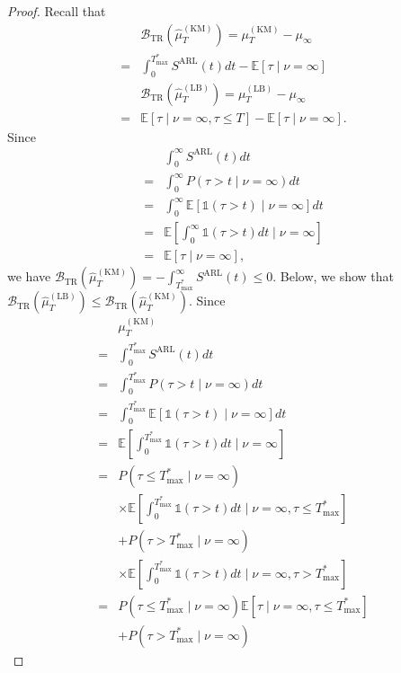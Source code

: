 \documentclass{article}
\theoremstyle{plain}
\theoremstyle{definition}
\theoremstyle{remark}
\def\nn{\nonumber \\ }
\def\mbe{\mathbb{E}}
\def\mbone{\mathds{1}}
\begin{document}
\begin{proof}
    Recall that 
    \begin{align}
        &\mathcal{B}_\mathrm{TR}(\hat{\mu}_T^\mathrm{(KM)}) =  \mu_T^{\mathrm{(KM)}} - \mu_\infty \nn
        =& \int_0^{T_\mathrm{max}^*} S^\mathrm{ARL}(t) dt
        - \mbe[\tau \mid \nu=\infty] \\
        &\mathcal{B}_\mathrm{TR}(\hat{\mu}_T^\mathrm{(LB)}) =  \mu_T^{\mathrm{(LB)}} - \mu_\infty \nn
        =& \mbe[\tau \mid \nu=\infty, \tau \leq T]
        - \mbe[\tau \mid \nu=\infty].
    \end{align}
    Since 
    \begin{align}
        &\int_0^\infty S^\mathrm{ARL}(t)  dt \\
        =& \int_0^\infty P(\tau > t \mid \nu = \infty) dt \\
        =& \int_0^\infty  \mbe[\mbone(\tau > t) \mid \nu = \infty] dt \\
        =& \mbe[\int_0^\infty \mbone(\tau > t) dt \mid \nu = \infty] \\
        =& \mbe[\tau \mid \nu=\infty]  ,
    \end{align}
    we have 
    $\mathcal{B}_\mathrm{TR}(\hat{\mu}_T^\mathrm{(KM)}) = - \int_{T_\mathrm{max}^*}^\infty S^\mathrm{ARL}(t) \leq 0$.    
    Below, we show that $\mathcal{B}_\mathrm{TR}(\hat{\mu}_T^\mathrm{(LB)}) \leq \mathcal{B}_\mathrm{TR}(\hat{\mu}_T^\mathrm{(KM)})$.
    Since
    \begin{align}
        &\mu_T^\mathrm{(KM)} \nn 
        =& \int_0^{T_\mathrm{max}^*} S^\mathrm{ARL}(t) dt \\
        =&  \int_0^{T_\mathrm{max}^*}  P(\tau > t \mid \nu=\infty) dt\\
        =&  \int_0^{T_\mathrm{max}^*} \mbe[\mbone(\tau > t) \mid \nu = \infty] dt\\
        =&  \mbe [\int_0^{T_\mathrm{max}^*} \mbone(\tau > t) dt \mid \nu = \infty]\\
        =&  P(\tau \leq T_\mathrm{max}^* \mid \nu=\infty) \nn 
            &\times \mbe[ \int_0^{T_\mathrm{max}^*} \mbone(\tau > t)  dt \mid \nu=\infty, \tau \leq T_\mathrm{max}^* ] \nn
            &+  P(\tau > T_\mathrm{max}^* \mid \nu=\infty) \nn 
            &\times \mbe[ \int_0^{T_\mathrm{max}^*} \mbone(\tau > t)  dt \mid \nu = \infty, \tau > T_\mathrm{max}^*]\\
        =&  P(\tau \leq T_\mathrm{max}^* \mid \nu=\infty ) 
            \mbe[ \tau \mid \nu=\infty, \tau \leq T_\mathrm{max}^*] \nn
            &+  P(\tau > T_\mathrm{max}^* \mid \nu=\infty ) 

\end{align}
\end{proof}
\end{document}
